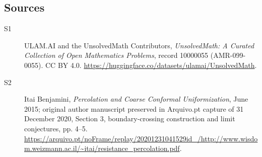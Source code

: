 \documentclass[11pt]{article}
\begin{document}
\subsection{Sources}
\begin{description}
\item[\hypertarget{source:10000055:1}{S1}] ULAM.AI and the UnsolvedMath Contributors, \emph{UnsolvedMath: A Curated Collection of Open Mathematics Problems}, record 10000055 (AMR-099-0055). CC BY 4.0. \url{https://huggingface.co/datasets/ulamai/UnsolvedMath}.
\item[\hypertarget{source:10000055:2}{S2}] Itai Benjamini, \emph{Percolation and Coarse Conformal Uniformization}, June 2015; original author manuscript preserved in Arquivo.pt capture of 31 December 2020, Section 3, boundary-crossing construction and limit conjectures, pp. 4--5. \url{https://arquivo.pt/noFrame/replay/20201231041529id_/http://www.wisdom.weizmann.ac.il/~itai/resistance_percolation.pdf}.
\end{description}
\label{end:10000055}
\end{document}
